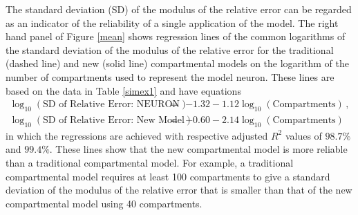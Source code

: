 
\pagebreak[4]

The standard deviation (SD) of the modulus of the relative error
can be regarded as an indicator of the reliability of a single
application of the model. The right hand panel of Figure
\ref{mean} shows regression lines of the common logarithms of the
standard deviation of the modulus of the relative error for the
traditional (dashed line) and new (solid line) compartmental
models on the logarithm of the number of compartments used to
represent the model neuron. These lines are based on the data in
Table \ref{simex1} and have equations
\begin{equation}\label{mean1}
\begin{array}{rcl}
\log_{10}(\mbox{SD of Relative Error: NEURON}) & = &
-1.32-1.12\log_{10}(\mbox{Compartments})\,, \\[5pt]
\log_{10}(\mbox{SD of Relative Error: New Model}) & = &
-0.60-2.14\log_{10}(\mbox{Compartments})
\end{array}
\end{equation}
in which the regressions are achieved with respective adjusted
$R^2$ values of $98.7\%$ and $99.4\%$. These lines show that the
new compartmental model is more reliable than a traditional
compartmental model. For example, a traditional compartmental
model requires at least 100 compartments to give a standard
deviation of the modulus of the relative error that is smaller
than that of the new compartmental model using 40 compartments.

